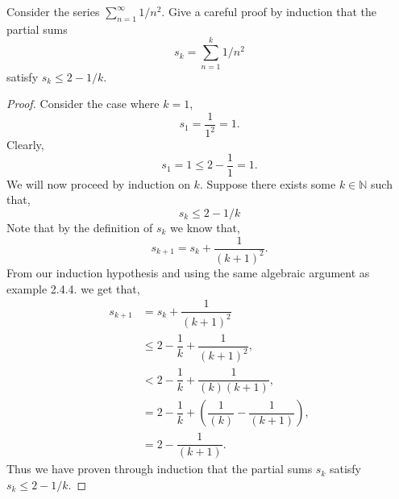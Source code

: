 \documentclass[12pt]{article}
\makeatletter
\theoremstyle{homework}
\newenvironment{exercise}[1]
{\def\@currentlabel{#1}\exercisecore}
{\endexercisecore}
\newcommand{\Nats}{\ensuremath{\mathbb N}}
\makeatother
\begin{document}
\begin{exercise}{Supplemental 4}
  
Consider the series $\sum_{n=1}^\infty 1/n^2$. 
Give a careful proof by induction that the partial sums
\[
s_k = \sum_{n=1}^k 1/n^2
\]
satisfy $s_k \le 2 - 1/k$.\\

\begin{proof}
  Consider the case where $k = 1$, 
  \begin{equation*}
    s_1 =\dfrac{1}{1^2} = 1.
  \end{equation*} 
  Clearly,
  \begin{equation*}
    s_1 = 1 \le 2- \dfrac{1}{1} = 1.
  \end{equation*}
We will now proceed by induction on $k$. Suppose there exists some $k \in \Nats$ such that,
\begin{equation*}
  s_k \le 2 - 1/k
\end{equation*}
Note that by the definition of $s_k$ we know that,
\begin{equation*}
  s_{k+1} = s_k + \dfrac{1}{(k+1)^2}.
\end{equation*}
From our induction hypothesis and using the same algebraic argument as example 2.4.4. we get that,
\begin{align*}
  s_{k+1} &= s_k + \dfrac{1}{(k+1)^2}\\
  &\le 2 - \dfrac{1}{k} + \dfrac{1}{(k+1)^2},\\
  &< 2 - \dfrac{1}{k} + \dfrac{1}{(k)(k+1)},\\
  &=  2 - \dfrac{1}{k} + (\dfrac{1}{(k)} - \dfrac{1}{(k+1)}),\\
  &=  2 - \dfrac{1}{(k+1)}.
\end{align*}
Thus we have proven through induction that the partial sums $s_k$ satisfy $s_k \le 2 - 1/k$.
\end{proof}
\end{exercise}
\vspace{.5in}
\end{document}

